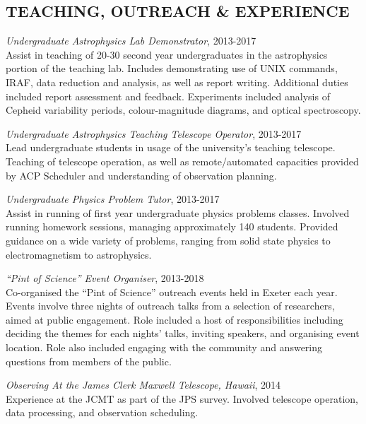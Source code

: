 \documentclass[letter, margin, 10pt]{res} %
\begin{document}
\begin{resume}
\section{TEACHING, OUTREACH \& EXPERIENCE}

{\sl Undergraduate Astrophysics Lab Demonstrator}, 2013-2017\\
Assist in teaching of 20-30 second year undergraduates in the astrophysics portion of the teaching lab. Includes demonstrating use of UNIX commands, IRAF, data reduction and analysis, as well as report writing. Additional duties included report assessment and feedback. Experiments included analysis of Cepheid variability periods, colour-magnitude diagrams, and optical spectroscopy.

{\sl Undergraduate Astrophysics Teaching Telescope Operator}, 2013-2017\\
Lead undergraduate students in usage of the university's teaching telescope. Teaching of telescope operation, as well as remote/automated capacities provided by ACP Scheduler and understanding of observation planning.

{\sl Undergraduate Physics Problem Tutor}, 2013-2017\\
Assist in running of first year undergraduate physics problems classes. Involved running homework sessions, managing approximately 140 students. Provided guidance on a wide variety of problems, ranging from solid state physics to electromagnetism to astrophysics. 

{\sl ``Pint of Science'' Event Organiser}, 2013-2018\\
Co-organised the ``Pint of Science'' outreach events held in Exeter each year. Events involve three nights of outreach talks from a selection of researchers, aimed at public engagement. Role included a host of responsibilities including deciding the themes for each nights' talks, inviting speakers, and organising event location. Role also included engaging with the community and answering questions from members of the public.

{\sl Observing At the James Clerk Maxwell Telescope, Hawaii}, 2014\\
Experience at the JCMT as part of the JPS survey. Involved telescope operation, data processing, and observation scheduling.

 


\end{resume}
\end{document}
